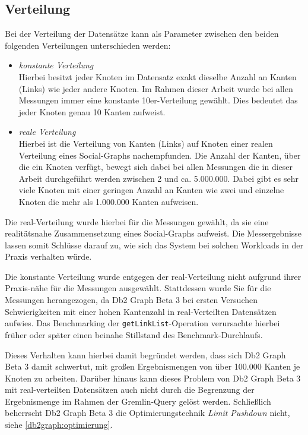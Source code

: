 \subsection{Verteilung}
Bei der Verteilung der Datensätze kann als Parameter zwischen den beiden folgenden Verteilungen unterschieden werden: 
\begin{itemize}
    \item \textit{konstante Verteilung}\\
    Hierbei besitzt jeder Knoten im Datensatz exakt dieselbe Anzahl an Kanten (Links) wie jeder andere Knoten. Im Rahmen dieser Arbeit wurde bei allen Messungen immer eine konstante 10er-Verteilung gewählt. Dies bedeutet das jeder Knoten genau 10 Kanten aufweist.  
    \item \textit{reale Verteilung}\\
    Hierbei ist die Verteilung von Kanten (Links) auf Knoten einer realen Verteilung eines Social-Graphs nachempfunden. Die Anzahl der Kanten, über die ein Knoten verfügt, bewegt sich dabei bei allen Messungen die in dieser Arbeit durchgeführt werden zwischen 2 und ca. 5.000.000. Dabei gibt es sehr viele Knoten mit einer geringen Anzahl an Kanten wie zwei und einzelne Knoten die mehr als 1.000.000 Kanten aufweisen. 
\end{itemize}

Die real-Verteilung wurde hierbei für die Messungen gewählt, da sie eine realitätsnahe Zusammensetzung eines Social-Graphs aufweist. Die Messergebnisse lassen somit Schlüsse darauf zu, wie sich das System bei solchen Workloads in der Praxis verhalten würde.

Die konstante Verteilung wurde entgegen der real-Verteilung nicht aufgrund ihrer Praxis-nähe für die Messungen ausgewählt. Stattdessen wurde Sie für die Messungen herangezogen, da Db2 Graph Beta 3 bei ersten Versuchen Schwierigkeiten mit einer hohen Kantenzahl in real-Verteilten Datensätzen aufwies. Das Benchmarking der \texttt{getLinkList}-Operation verursachte hierbei früher oder später einen beinahe Stillstand des Benchmark-Durchlaufs. 

Dieses Verhalten kann hierbei damit begründet werden, dass sich Db2 Graph Beta 3 damit schwertut, mit großen Ergebnismengen von über 100.000 Kanten je Knoten zu arbeiten. Darüber hinaus kann dieses Problem von Db2 Graph Beta 3 mit real-verteilten Datensätzen auch nicht durch die Begrenzung der Ergebnismenge im Rahmen der Gremlin-Query gelöst werden. Schließlich beherrscht Db2 Graph Beta 3 die Optimierungstechnik \textit{Limit Pushdown} nicht, siehe \autoref{db2graph:optimierung}. 

